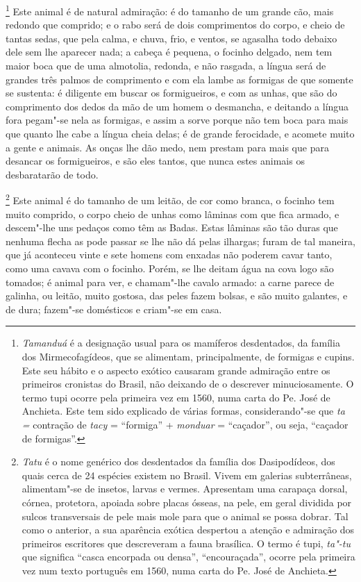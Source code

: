 \footnote{ \textit{Tamanduá} é a designação
usual para os mamíferos desdentados, da família dos Mirmecofagídeos,
que se alimentam, principalmente, de formigas e cupins. Este seu hábito
e o aspecto exótico causaram grande admiração entre os primeiros
cronistas do Brasil, não deixando de o descrever minuciosamente. O
termo tupi ocorre pela primeira vez em 1560, numa carta do Pe.
José de Anchieta. Este tem sido explicado de várias formas,
considerando"-se que \textit{ta =} contração de \textit{tacy} = 
``formiga'' + \textit{monduar} = ``caçador'', ou seja, ``caçador de
formigas''.} Este animal é de natural admiração: é do tamanho
de um grande cão, mais redondo que comprido; e o rabo será de dois
comprimentos do corpo, e cheio de tantas sedas, que pela calma, e
chuva, frio, e ventos, se agasalha todo debaixo dele sem lhe aparecer
nada; a cabeça é pequena, o focinho delgado, nem tem maior boca que de
uma almotolia, redonda, e não rasgada, a língua será de grandes três
palmos de comprimento e com ela lambe as formigas de que somente se
sustenta: é diligente em buscar os formigueiros, e com as unhas, que
são do comprimento dos dedos da mão de um homem o desmancha, e deitando
a língua fora pegam"-se nela as formigas, e assim a sorve porque não tem
boca para mais que quanto lhe cabe a língua cheia delas; é de grande
ferocidade, e acomete muito a gente e animais. As onças lhe dão medo,
nem prestam para mais que para desancar os formigueiros, e são eles
tantos, que nunca estes animais os desbaratarão de todo.

\footnote{ \textit{Tatu} é o nome genérico dos
desdentados da família dos Dasipodídeos, dos quais cerca de 24 
espécies existem no Brasil. Vivem em galerias subterrâneas,
alimentam"-se de insetos, larvas e vermes. Apresentam uma carapaça
dorsal, córnea, protetora, apoiada sobre placas ósseas, na pele, em
geral dividida por sulcos transversais de pele mais mole para que o
animal se possa dobrar. Tal como o anterior, a sua aparência exótica
despertou a atenção e admiração dos primeiros escritores que
descreveram a fauna brasílica. O termo é tupi, \textit{ta"-tu} que
significa ``casca encorpada ou densa'', ``encouraçada'', ocorre pela
primeira vez num texto português em 1560, numa carta do Pe.
José de Anchieta.} Este animal é do tamanho de um leitão, de
cor como branca, o focinho tem muito comprido, o corpo cheio de unhas
como lâminas com que fica armado, e descem"-lhe uns pedaços como têm as
Badas. Estas lâminas são tão duras que nenhuma flecha as pode passar se
lhe não dá pelas ilhargas; furam de tal maneira, que já aconteceu vinte
e sete homens com enxadas não poderem cavar tanto, como uma cavava com
o focinho. Porém, se lhe deitam água na cova logo são tomados; é animal
para ver, e chamam"-lhe cavalo armado: a carne parece de galinha, ou
leitão, muito gostosa, das peles fazem bolsas, e são muito galantes, e
de dura; fazem"-se domésticos e criam"-se em casa.

